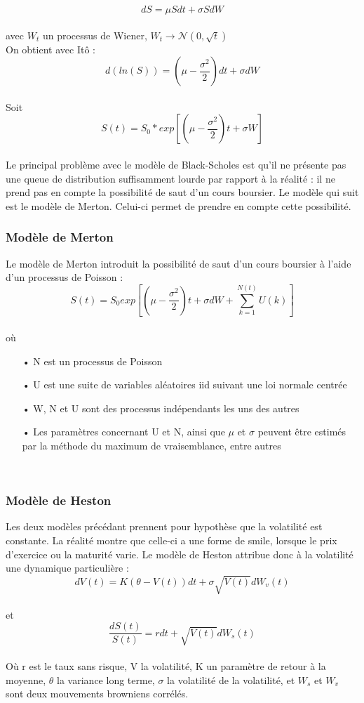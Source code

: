 \documentclass[french,12pt,a4paper]{article}
\begin{document}
$$ dS = \mu Sdt + \sigma SdW $$  \\
avec $W_{t}$ un processus de Wiener, $ W_{t} \rightarrow \mathcal{N}(0,\sqrt{t}) $ \\

On obtient avec Itô : \\
$$ d(ln(S))=(\mu - \frac{\sigma^{2}}{2})dt + \sigma dW $$ \\
Soit \\
$$ S(t) = S_{0} * exp \left[(\mu - \frac{\sigma^{2}}{2})t + \sigma W \right] $$ \\

Le principal problème avec le modèle de Black-Scholes est qu'il ne présente pas une queue de distribution suffisamment lourde par rapport à la réalité : il ne prend pas en compte la possibilité de saut d'un cours boursier. Le modèle qui suit est le modèle de Merton. Celui-ci permet de prendre en compte cette possibilité.\\

\subsubsection{Modèle de Merton}
Le modèle de Merton introduit la possibilité de saut d'un cours boursier à l'aide d'un processus de Poisson :\\

$$ S(t) = S_{0} exp \left[(\mu - \frac{\sigma^{2}}{2})t + \sigma dW + \sum_{k=1}^{N(t)} U(k) \right] $$ \\
où
\begin{itemize}
\item[•] N est un processus de Poisson
\item[•] U est une suite de variables aléatoires iid suivant une loi normale centrée
\item[•] W, N et U sont des processus indépendants les uns des autres
\item[•] Les paramètres concernant U et N, ainsi que $\mu$ et $\sigma$ peuvent être estimés par la méthode du maximum de vraisemblance, entre autres
\end{itemize}
\\

\subsubsection{Modèle de Heston}
Les deux modèles précédant prennent pour hypothèse que la volatilité est constante. La réalité montre que celle-ci a une forme de smile, lorsque le prix d'exercice ou la maturité varie. Le modèle de Heston attribue donc à la volatilité une dynamique particulière : \\
$$ dV(t) = K(\theta - V(t))dt + \sigma \sqrt{V(t)} dW_{v}(t)  $$ \\
et \\
$$ \frac{dS(t)}{S(t)} = rdt + \sqrt{V(t)}dW_{s}(t) $$ \\
Où r est le taux sans risque, V la volatilité, K un paramètre de retour à la moyenne, $\theta$ la variance long terme, $\sigma$ la volatilité de la volatilité, et  $W_{s}$ et $W_{v}$ sont deux mouvements browniens corrélés.\\
\end{document}
